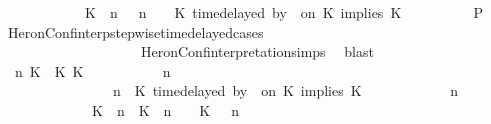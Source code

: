 \begin{isabellebody}
\ \ \ \ \ \ \ \ \ \ \ \ {\isacharparenleft}{\isacharparenleft}{\isacharparenleft}K\ {\isasymnot}{\isasymUp}\ n{\isacharparenright}\ {\isacharhash}\ {\isasymGamma}{\isacharparenright}{\isacharcomma}\ n\ {\isasymturnstile}\ {\isasymPsi}\ {\isasymtriangleright}\ {\isacharparenleft}{\isacharparenleft}K\ time{\isacharminus}delayed\ by\ {\isasymdelta}{\isasymtau}\ on\ K\ implies\ K\ {\isacharhash}\ {\isasymPhi}{\isacharparenright}{\isacharparenright}{\isacartoucheclose}\isanewline
\ \ \ \ \ \ \isamarkupfalse%
\ {\isacharquery}P\ \isamarkupfalse%
\ HeronConf{\isacharunderscore}interp{\isacharunderscore}stepwise{\isacharunderscore}timedelayed{\isacharunderscore}cases\isanewline
\ \ \ \ \ \ \ \ \ \ \ \ \ \ \ \ \ \ \ \ HeronConf{\isacharunderscore}interpretation{\isachardot}simps\ \isamarkupfalse%
\ blast\isanewline
\ \ \ \ \isamarkupfalse%
\isanewline
\ \ \ \ \ \ \isamarkupfalse%
\ {\isasymGamma}\ n\ K\ {\isasymdelta}{\isasymtau}\ K\ K\ {\isasymPsi}\ {\isasymPhi}\isanewline
\ \ \ \ \ \ \isamarkupfalse%
\ {\isacartoucheopen}{\isacharparenleft}{\isasymGamma}\ n\ {\isasymturnstile}\ {\isasymPsi}\ {\isasymtriangleright}\ {\isasymPhi}\ {\isacharequal}\isanewline
\ \ \ \ \ \ \ \ \ \ \ \ \ \ \ {\isacharparenleft}{\isasymGamma}{\isacharcomma}\ n\ {\isasymturnstile}\ {\isacharparenleft}{\isacharparenleft}K\ time{\isacharminus}delayed\ by\ {\isasymdelta}{\isasymtau}\ on\ K\ implies\ K\ {\isacharhash}\ {\isasymPsi}{\isacharparenright}\ {\isasymtriangleright}\ {\isasymPhi}{\isacharparenright}{\isacartoucheclose}\isanewline
\ \ \ \ \ \ \ {\isacartoucheopen}{\isacharparenleft}{\isasymGamma}\ n\ {\isasymturnstile}\ {\isasymPsi}\ {\isasymtriangleright}\ {\isasymPhi}\isanewline
\ \ \ \ \ \ \ \ \ \ \ \ {\isacharequal}\ {\isacharparenleft}{\isacharparenleft}{\isacharparenleft}K\ {\isasymUp}\ n{\isacharparenright}\ {\isacharhash}\ {\isacharparenleft}K\ {\isacharat}\ n\ {\isasymoplus}\ {\isasymdelta}{\isasymtau}\ {\isasymRightarrow}\ K\ {\isacharhash}\ {\isasymGamma}{\isacharparenright}{\isacharcomma}\ n\isanewline

\end{isabellebody}
